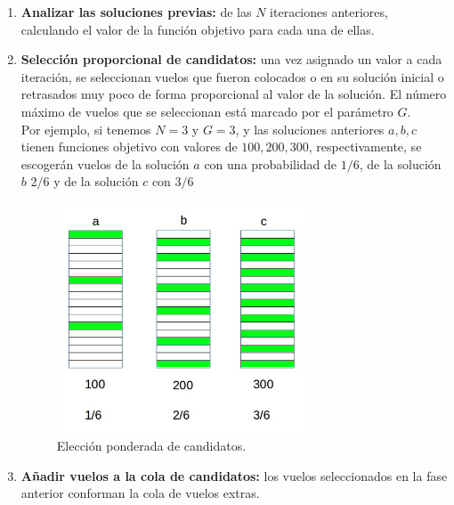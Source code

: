 \begin{enumerate}
	\item \textbf{Analizar las soluciones previas:} de las $N$ iteraciones anteriores, calculando el valor de la función objetivo para cada una de ellas.
	
	\item \textbf{Selección proporcional de candidatos:} una vez asignado un valor a cada iteración, se seleccionan vuelos que fueron colocados o en su solución inicial o retrasados muy poco de forma proporcional al valor de la solución. El número máximo de vuelos que se seleccionan está marcado por el parámetro $G$.\\
	
	Por ejemplo, si tenemos $N=3$ y $G=3$, y las soluciones anteriores $a,b,c$ tienen funciones objetivo con valores de $100,200,300$, respectivamente, se escogerán vuelos de la solución $a$ con una probabilidad de $1/6$, de la solución $b$ $2/6$ y de la solución $c$ con $3/6$
	\begin{figure}[H]
		\begin{center}
			\centering
			\includegraphics[width=0.7\textwidth]{./imagenes/heuristico/valorSoluciones.jpg}
			\caption{Elección ponderada de candidatos.}
			\label{fig: Elección ponderada de candidatos}
		\end{center}
	\end{figure}
	
	\item \textbf{Añadir vuelos a la cola de candidatos:} los vuelos seleccionados  en la fase anterior conforman la cola de vuelos extras.
	

\end{enumerate}
